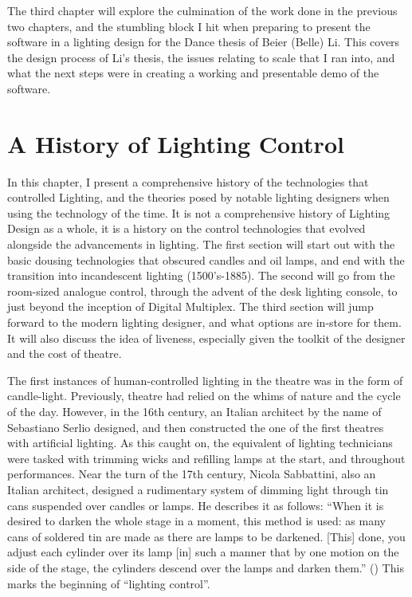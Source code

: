 \documentclass[12pt,twoside]{reedthesis}
\begin{document}
    The third chapter will explore the culmination of the work done in the previous two chapters, and the stumbling block I hit when preparing to present the software in a lighting design for the Dance thesis of Beier (Belle) Li. This covers the design process of Li's thesis, the issues relating to scale that I ran into, and what the next steps were in creating a working and presentable demo of the software.
	
\chapter{A History of Lighting Control}
In this chapter, I present a comprehensive history of the technologies that controlled Lighting, and the theories posed by notable lighting designers when using the technology of the time. It is not a comprehensive history of Lighting Design as a whole, it is a history on the control technologies that evolved alongside the advancements in lighting. The first section will start out with the basic dousing technologies that obscured candles and oil lamps, and end with the transition into incandescent lighting (1500's-1885). The second will go from the room-sized analogue control, through the advent of the desk lighting console, to just beyond the inception of Digital Multiplex. The third section will jump forward to the modern lighting designer, and what options are in-store for them. It will also discuss the idea of liveness, especially given the toolkit of the designer and the cost of theatre.

The first instances of human-controlled lighting in the theatre was in the form of candle-light. Previously, theatre had relied on the whims of nature and the cycle of the day. However, in the 16th century, an Italian architect by the name of Sebastiano Serlio designed, and then constructed the one of the first theatres with artificial lighting. \cite{serlio_five_1611} As this caught on, the equivalent of lighting technicians were tasked with trimming wicks and refilling lamps at the start, and throughout performances. Near the turn of the 17th century, Nicola Sabbattini, also an Italian architect, designed a rudimentary system of dimming light through tin cans suspended over candles or lamps. He describes it as follows: “When it is desired to darken the whole stage in a moment, this method is used: as many cans of soldered tin are made as there are lamps to be darkened. [This] done, you adjust each cylinder over its lamp [in] such a manner that by one motion on the side of the stage, the cylinders descend over the lamps and darken them.” (\cite{internet_archive_renaissance_1958}) This marks the beginning of “lighting control”.
 
\end{document}
